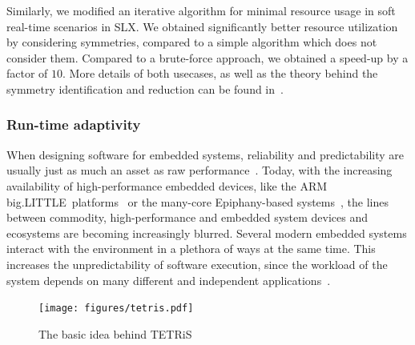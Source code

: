 \documentclass[sigplan,10pt]{acmart}
\begin{document}
Similarly, we modified an iterative algorithm for minimal resource usage in soft real-time scenarios in SLX. We obtained significantly better resource utilization by considering symmetries, compared to a simple algorithm which does not consider them. 
Compared to a brute-force approach, we obtained a speed-up by a factor of $10$. More details of both usecases, as well as the theory behind the symmetry identification and reduction can be found in~\cite{goens_taco17}.

\subsubsection{Run-time adaptivity}


When designing software for embedded systems, reliability and predictability are usually just as much an asset as raw performance~\cite{edwards2007case,axer2014building,lee2008cyber}.
Today, with the increasing availability of high-performance embedded devices, like the ARM big.LITTLE\texttrademark~platforms~\cite{biglittlewhitepaper} or the many-core Epiphany-based systems~\cite{olofsson2016epiphany}, the lines between commodity, high-performance and embedded system devices and ecosystems are becoming increasingly blurred.
Several modern embedded systems interact with the environment in a plethora of ways at the same time.
This increases the unpredictability of software execution, since the workload of the system depends on many different and independent applications~\cite{lee2008cyber}.

\begin{figure}[t]
	\centering
	\texttt{[image: figures/tetris.pdf]}
	\caption{The basic idea behind TETRiS}
	\label{fig:tetris_idea}
\end{figure}
\end{document}
